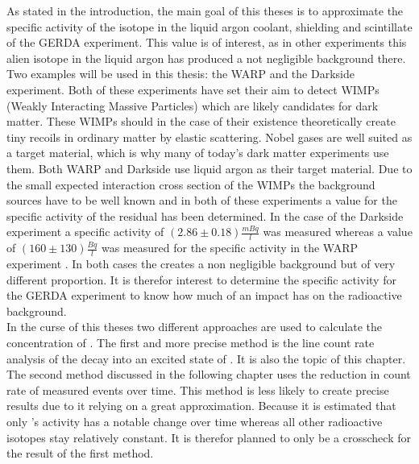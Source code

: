 As stated in the introduction, the main goal of this theses is to approximate the specific activity of the isotope \Kr in the liquid argon coolant, shielding and scintillate of the GERDA experiment. 
This value is of interest, as in other experiments this alien isotope in the liquid argon has produced a not negligible background there. 
Two examples will be used in this thesis: the WARP and the Darkside experiment.
Both of these experiments have set their aim to detect WIMPs (Weakly Interacting Massive Particles) which are likely candidates for dark matter.
These WIMPs should in the case of their existence theoretically create tiny recoils in ordinary matter by elastic scattering.
Nobel gases are well suited as a target material, which is why many of today's dark matter experiments use them.
Both WARP and Darkside use liquid argon as their target material.
Due to the small expected interaction cross section of the WIMPs the background sources have to be well known and in both of these experiments a value for the specific activity of the residual \Kr has been determined.
In the case of the Darkside experiment a specific activity of  \((2.86\pm0.18) \frac{\unit{mBq}}{\unit{l}}\)  \cite{agnes_results_2016} was measured whereas a value of \((160\pm130)\frac{\unit{Bq}}{\unit{l}}\) was measured for the specific activity in the WARP experiment \cite{benetti_measurement_2006}.
In both cases the \Kr creates a non negligible background but of very different proportion. 
It is therefor interest to determine the specific activity for the GERDA experiment to know how much of an impact \Kr has on the radioactive background.
\\

In the curse of this theses two different approaches are used to calculate the concentration of \Kr. 
The first and more precise method is the line count rate analysis of the \Kr decay into an excited state of . 
It is also the topic of this chapter.
The second method discussed in the following chapter uses the reduction in count rate of measured events over time. 
This method is less likely to create precise results due to it relying on a great approximation.
Because it is estimated that only \Kr's activity has a notable change over time whereas all other radioactive isotopes stay relatively constant. 
It is therefor planned to only be a crosscheck for the result of the first method.
\\

